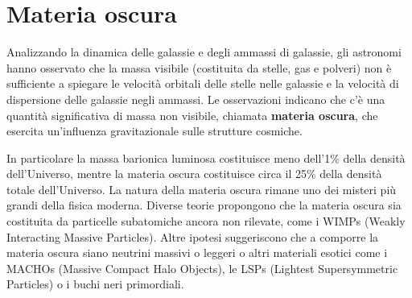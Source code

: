 \section{Materia oscura}
Analizzando la dinamica delle galassie e degli ammassi di galassie, gli astronomi hanno osservato che la massa visibile (costituita da stelle, gas e polveri) non è sufficiente a spiegare le velocità orbitali delle stelle nelle galassie e la velocità di dispersione delle galassie negli ammassi. Le osservazioni indicano che c'è una quantità significativa di massa non visibile, chiamata \textbf{materia oscura}, che esercita un'influenza gravitazionale sulle strutture cosmiche.\\


In particolare la massa barionica luminosa costituisce meno dell'1\% della densità dell'Universo, mentre la materia oscura costituisce circa il 25\% della densità totale dell'Universo. La natura della materia oscura rimane uno dei misteri più grandi della fisica moderna. Diverse teorie propongono che la materia oscura sia costituita da particelle subatomiche ancora non rilevate, come i WIMPs (Weakly Interacting Massive Particles). Altre ipotesi suggeriscono che a comporre la materia oscura siano neutrini massivi o leggeri o altri materiali esotici come i MACHOs (Massive Compact Halo Objects), le LSPs (Lightest Supersymmetric Particles) o i buchi neri primordiali.\\

